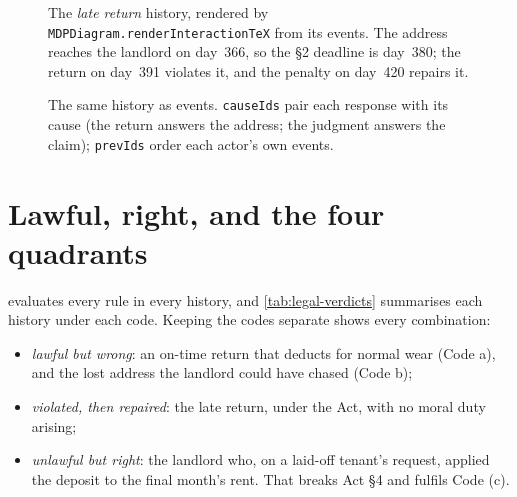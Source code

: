 \begin{figure}[ht]
\centering
{}
\caption{The \emph{late return} history, rendered by \texttt{MDPDiagram.renderInteractionTeX} from its events. The address reaches the landlord on day~366, so the \S2 deadline is day~380; the return on day~391 violates it, and the penalty on day~420 repairs it.}
\end{figure}

\begin{figure}[ht]
\centering
{}
\caption{The same history as events. \texttt{causeIds} pair each response with its cause (the return answers the address; the judgment answers the claim); \texttt{prevIds} order each actor's own events.}
\end{figure}

\section{Lawful, right, and the four quadrants}

 evaluates every rule in every history, and
\cref{tab:legal-verdicts} summarises each history under each code. Keeping the
codes separate shows every combination:

\begin{itemize}
\item \emph{lawful but wrong}: an on-time return that deducts for normal wear
(Code a), and the lost address the landlord could have chased (Code b);
\item \emph{violated, then repaired}: the late return, under the Act, with no
moral duty arising;
\item \emph{unlawful but right}: the landlord who, on a laid-off tenant's request,
applied the deposit to the final month's rent. That breaks Act \S4 and fulfils
Code (c).
\end{itemize}

